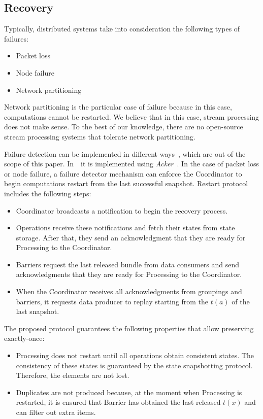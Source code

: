 \subsection{Recovery}

Typically, distributed systems take into consideration the following types of failures:
\begin{itemize}
    \item Packet loss
    \item Node failure
    \item Network partitioning
\end{itemize}

Network partitioning is the particular case of failure because in this case, computations cannot be restarted. We believe that in this case, stream processing does not make sense. To the best of our knowledge, there are no open-source stream processing systems that tolerate network partitioning.

Failure detection can be implemented in different ways~\cite{hayashibara2002failure}, which are out of the scope of this paper. In~\FlameStream\ it is implemented using {\em Acker}~\cite{we2018adbis}. In the case of packet loss or node failure, a failure detector mechanism can enforce the Coordinator to begin computations restart from the last successful snapshot. Restart protocol includes the following steps:

\begin{itemize}
    \item Coordinator broadcasts a notification to begin the recovery process.
    \item Operations receive these notifications and fetch their states from state storage. After that, they send an acknowledgment that they are ready for Processing to the Coordinator.
    \item Barriers request the last released bundle from data consumers and send acknowledgments that they are ready for Processing to the Coordinator.
    \item When the Coordinator receives all acknowledgments from groupings and barriers, it requests data producer to replay starting from the $t(a)$ of the last snapshot.
\end{itemize}

The proposed protocol guarantees the following properties that allow preserving~ exactly-once:

\begin{itemize}
    \item Processing does not restart until all operations obtain consistent states. The consistency of these states is guaranteed by the state snapshotting protocol. Therefore, the elements are not lost.
    \item Duplicates are not produced because, at the moment when Processing is restarted, it is ensured that Barrier has obtained the last released $t(x)$ and can filter out extra items.
\end{itemize}